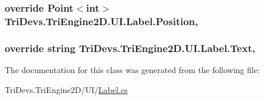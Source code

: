 \hypertarget{class_tri_devs_1_1_tri_engine2_d_1_1_u_i_1_1_label_adc1aa6af6f6ba7e66611ae9be5a1033b}{
\subsubsection[{Position}]{\setlength{\rightskip}{0pt plus 5cm}override Point$<$int$>$ Tri\-Devs.\-Tri\-Engine2\-D.\-U\-I.\-Label.\-Position\hspace{0.3cm}{\ttfamily [get]}, {\ttfamily [set]}}}\label{class_tri_devs_1_1_tri_engine2_d_1_1_u_i_1_1_label_adc1aa6af6f6ba7e66611ae9be5a1033b}
\hypertarget{class_tri_devs_1_1_tri_engine2_d_1_1_u_i_1_1_label_a06d91dd4e855e27c97b5b652653e4971}{
\subsubsection[{Text}]{\setlength{\rightskip}{0pt plus 5cm}override string Tri\-Devs.\-Tri\-Engine2\-D.\-U\-I.\-Label.\-Text\hspace{0.3cm}{\ttfamily [get]}, {\ttfamily [set]}}}\label{class_tri_devs_1_1_tri_engine2_d_1_1_u_i_1_1_label_a06d91dd4e855e27c97b5b652653e4971}


The documentation for this class was generated from the following file\-:\begin{DoxyCompactItemize}
\item 
Tri\-Devs.\-Tri\-Engine2\-D/\-U\-I/\hyperlink{_label_8cs}{Label.\-cs}\end{DoxyCompactItemize}
